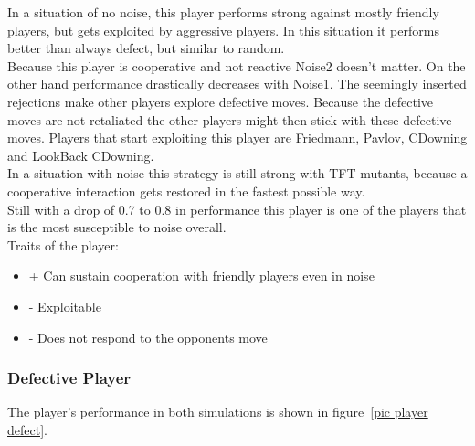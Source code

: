 In a situation of no noise, this player performs strong against mostly friendly players, but gets exploited by aggressive players. In this situation it performs better than always defect, but similar to random.\\

Because this player is cooperative and not reactive Noise2 doesn't matter. On the other hand performance drastically decreases with Noise1. The seemingly inserted rejections make other players explore defective moves. Because the defective moves are not retaliated the other players might then stick with these defective moves. Players that start exploiting this player are Friedmann, Pavlov, CDowning and LookBack CDowning.\\

In a situation with noise this strategy is still strong with TFT mutants, because a cooperative interaction gets restored in the fastest possible way.\\

Still with a drop of 0.7 to 0.8 in performance this player is one of the players that is the most susceptible to noise overall.\\

Traits of the player:

\renewcommand{\labelitemi}{}

\begin{itemize}
	\item + Can sustain cooperation with friendly players even in noise
	\item - Exploitable
	\item - Does not respond to the opponents move
\end{itemize}
\renewcommand{\labelitemi}{$\bullet$}

\subsubsection{Defective Player}

The player's performance in both simulations is shown in figure~\ref{pic player defect}.\\

